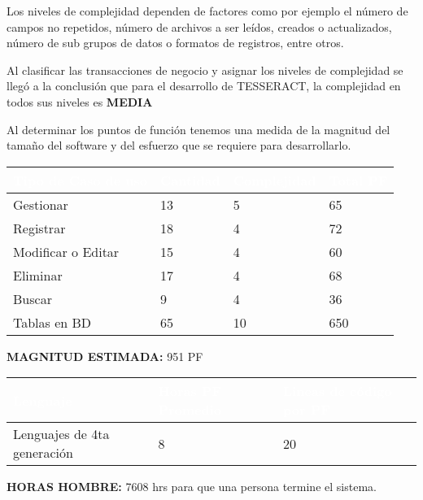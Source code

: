 Los niveles de complejidad dependen de factores como por ejemplo el número de campos no repetidos, número de archivos a ser leídos, creados o actualizados, número de sub grupos de datos o formatos de registros, entre otros.

Al clasificar las transacciones de negocio y asignar los niveles de complejidad se llegó a la conclusión que para el desarrollo de TESSERACT, la complejidad en todos sus niveles es \textbf {MEDIA}

Al determinar los puntos de función tenemos una medida de la magnitud del tamaño del software y del esfuerzo que se requiere para desarrollarlo.

\begin{table}[H]
	\centering
	\begin{tabular}{|p{4cm}|p{3cm}|p{3cm}|p{3cm}|}
		\hline
		\rowcolor{black} \textcolor{white} {\textbf{Tipo de Caso de uso}} & \textcolor{white}{\textbf{Cantidad}} & \textcolor{white}{\textbf{Complejidad}} & \textcolor{white}{\textbf{Total PF}} \\ 
		\hline
		Gestionar & 13  &  5 &  65  \\
		\hline
		Registrar & 18 &  4 &  72 \\
		\hline
		Modificar o Editar & 15 &  4 &  60  \\
		\hline
		Eliminar & 17 &  4 &  68  \\
		\hline
		Buscar & 9 &  4 &  36 \\
		\hline
		Tablas en BD & 65 &  10 &  650 \\
		\hline
	\end{tabular}
\end{table}

\textbf {MAGNITUD ESTIMADA:} 951 PF\\

\begin{table}[H]
	\centering
	\begin{tabular}{|p{5cm}|p{3cm}|p{3cm}|}
		\hline
		\rowcolor{black} \textcolor{white} {\textbf{Lenguaje}} & \textcolor{white}{\textbf{Horas PF Promedio}} & \textcolor{white}{\textbf{Lineas de código por PF}} \\ \hline
		Lenguajes de 4ta generación & 8  & 20 \\
		\hline
	\end{tabular}
\end{table}

\textbf {HORAS HOMBRE:} 7608 hrs para que una persona termine el sistema.\\


